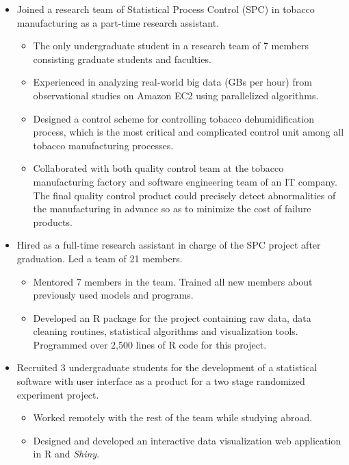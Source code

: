 \documentclass[11pt]{article}
\begin{document}
\begin{itemize}
	\item Joined a research team of Statistical Process Control (SPC) in tobacco manufacturing as a part-time research assistant.
	\begin{itemize}
		\item The only undergraduate student in a research team of 7 members consisting graduate students and faculties.
		\item Experienced in analyzing real-world big data (GBs per hour) from observational studies on Amazon EC2 using parallelized algorithms.
		\item Designed a control scheme for controlling tobacco dehumidification process, which is the most critical and complicated control unit among all tobacco manufacturing processes.
		\item Collaborated with both quality control team at the tobacco manufacturing factory and software engineering team of an IT company. The final quality control product could precisely detect abnormalities of the manufacturing in advance so as to minimize the cost of failure products.
	\end{itemize}

	\item Hired as a full-time research assistant in charge of the SPC project after graduation. Led a team of 21 members.
	\begin{itemize}
		\item Mentored 7 members in the team. Trained all new members about previously used models and programs.
		\item Developed an R package for the project containing raw data, data cleaning routines, statistical algorithms and visualization tools. Programmed over 2,500 lines of R code for this project.
	\end{itemize}

	\item Recruited 3 undergraduate students for the development of a statistical software with user interface as a product for a two stage randomized experiment project.
	\begin{itemize}
		\item Worked remotely with the rest of the team while studying abroad.
		\item Designed and developed an interactive data visualization web application in R and \emph{Shiny}.
	\end{itemize}
\end{itemize}
\end{document}
